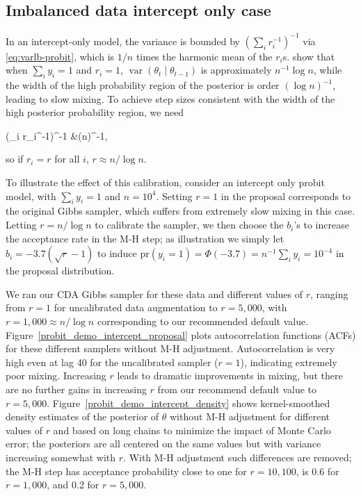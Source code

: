 \documentclass[10pt]{article}
\newcommand{\be}{\begin{equs}}
\newcommand{\ee}{\end{equs}}
\DeclareMathOperator{\var}{var}
\begin{document}
\subsection{Imbalanced data intercept only case}

In an intercept-only model, the variance is bounded by $\left(\sum_i r_i^{-1}\right)^{-1}$ via \eqref{eq:varlb-probit}, which is $1/n$ times the harmonic mean of the $r_i$s. \cite{johndrow2016inefficiency} show that when $\sum_i y_i = 1$ and $r_i = 1$, $\var(\theta_t \mid \theta_{t-1})$ is approximately $n^{-1} \log n$, while the width of the high probability region of the posterior is order $(\log n)^{-1}$, leading to slow mixing. To achieve step sizes consistent with the width of the high posterior probability region, we need
\be
\left(\sum_i r_i^{-1}\right)^{-1} &\approx (\log n)^{-1},
\ee
so if $r_i = r$ for all $i$, $r \approx n/\log n$.

To illustrate the effect of this calibration, consider an intercept only probit model, with $\sum_i y_i =1$ and $n=10^4$. Setting $r=1$ in the proposal corresponds to the original \cite{albert1993bayesian} Gibbs sampler, which suffers from extremely slow mixing in this case.  Letting $r = n/\log n$ to calibrate the sampler, we then choose the $b_i$'s to increase the acceptance rate in the M-H step; as illustration we simply let $b_i = -3.7 (\sqrt r -1)$ to induce $\mbox{pr}(y_i = 1) = \Phi(-3.7) = n^{-1}\sum_i y_i = 10^{-4}$ in the proposal distribution.  %

We ran our CDA Gibbs sampler for these data and different values of $r$, ranging from $r=1$ for uncalibrated data augmentation to $r=5,000$, with $r=1,000 \approx n/\log n$ corresponding to our recommended default value.  Figure~\ref{probit_demo_intercept_proposal} plots autocorrelation functions (ACFs) for these different samplers without  M-H adjustment. Autocorrelation is very high even at lag 40 for the uncalibrated sampler ($r=1$), indicating extremely poor mixing.  Increasing $r$ leads to dramatic improvements in mixing, but there are no further gains in increasing $r$ from our recommend default value to $r=5,000$. Figure~\ref{probit_demo_intercept_density} shows kernel-smoothed density estimates of the posterior of $\theta$ without M-H adjustment for different values of $r$ and based on long chains to minimize the impact of Monte Carlo error; the posteriors are all centered on the same values but with variance increasing somewhat with $r$.  With M-H adjustment such differences are removed; the M-H step has acceptance probability close to one for $r=10,100$, is 0.6 for $r=1,000$, and 0.2 for $r=5,000$.
\end{document}
